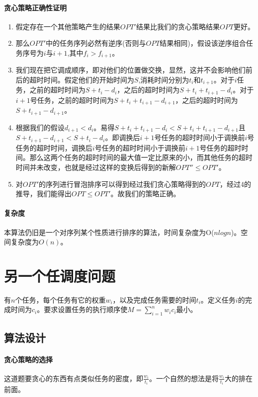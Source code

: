 \paragraph*{贪心策略正确性证明}
\begin{enumerate}
    \item 假定存在一个其他策略产生的结果$OPT'$结果比我们的贪心策略结果$OPT$更好。
    \item 那么$OPT'$中的任务序列必然有逆序(否则与$OPT$结果相同)，假设该逆序组合任务序号为$i$与$i+1$,其中$f_i>f_{i+1}$。
    \item 我们现在把它调成顺序，即对他们的位置做交换，显然，这并不会影响他们前后的超时时间。假定他们的开始时间为$S$,消耗时间分别为$t_i$和$t_{i+1}$。对于$i$任务，之前的超时时间为$S+t_i-d_i$，之后的超时时间为$S+t_i+t_{i+1}-d_i$。对于$i+1$号任务，之前的超时时间为$S+t_i+t_{i+1}-d_{i+1}$，之后的超时时间为$S+t_{i+1}-d_{i+1}$。
    \item 根据我们的假设$d_{i+1}<d_i$。易得$S+t_i+t_{i+1}-d_i<S+t_i+t_{i+1}-d_{i+1}$且$S+t_{i+1}-d_{i+1}<S+t_i-d_i$。即调换后$i+1$号任务的超时时间小于调换前$i$号任务的超时时间，调换后$i$号任务的超时时间小于调换前$i+1$号任务的超时时间。那么这两个任务的超时时间的最大值一定比原来的小，而其他任务的超时时间并未改变，也就是经过这样的变换后得到的新解$OPT'' \leq OPT'$。
    \item 对$OPT'$的序列进行冒泡排序可以得到经过我们贪心策略得到的$OPT$，经过4的推导，我们能得出$OPT \leq OPT'$。故我们的策略正确。
\end{enumerate}

\paragraph*{复杂度}
本算法仍旧是一个对序列某个性质进行排序的算法，时间复杂度为O($nlogn$)。空间复杂度为$O(n)$。

\section{另一个任调度问题}
\begin{example}
    有$n$个任务，每个任务有它的权重$w_i$，以及完成任务需要的时间$t_i$。定义任务$i$的完成时间为$c_i$。要求设置任务的执行顺序使$M = \sum_{i=1}^n w_ic_i$最小。
\end{example}

\subsection{算法设计}

\paragraph*{贪心策略的选择}
这道题要贪心的东西有点类似任务的密度，即$\frac{w_i}{t_i}$。一个自然的想法是将$\frac{w_i}{t_i}$大的排在前面。

